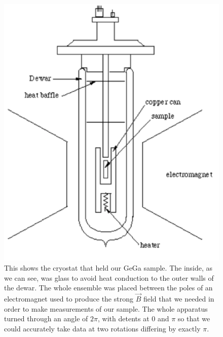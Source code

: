 \documentclass[reprint, nobibnotes, amssymb, amsmath, amsfonts, physics, mathtools, mathrsfs, floatfix]{revtex4-1}
\begin{document}
\begin{widetext}
      \begin{figure}[h]
        \centering
        \includegraphics[width=\linewidth]{dewar.png}
        \caption{This shows the cryostat that held our GeGa sample.  The inside, as we can see, was glass to avoid heat conduction to the outer walls of the dewar.  The whole ensemble was placed between the poles of an electromagnet used to produce the strong $\vec{B}$ field that we needed in order to make measurements of our sample.  The whole apparatus turned through an angle of $2\pi$, with detents at $0$ and $\pi$ so that we could accurately take data at two rotations differing by exactly $\pi$.~\label{dewar}~\cite{lab_manual}}
      \end{figure}


\end{widetext}
\end{document}
